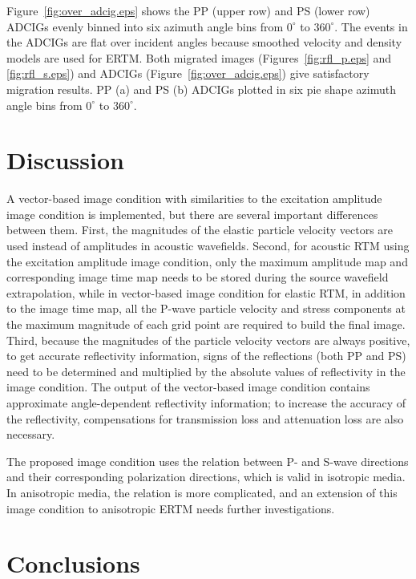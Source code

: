 \documentclass[manuscript,ulem,graphix,revised]{geophysics}
\begin{document}
Figure~\ref{fig:over_adcig.eps} shows the PP (upper row) and PS (lower row) ADCIGs evenly binned into six azimuth angle bins from $\mathrm{0^\circ}$ to $\mathrm{360^\circ}$. The events in the ADCIGs are flat over incident angles because smoothed velocity and density models are used for ERTM. Both migrated images (Figures~\ref{fig:rfl_p.eps} and \ref{fig:rfl_s.eps}) and ADCIGs (Figure~\ref{fig:over_adcig.eps}) give satisfactory migration results.
{
PP (a) and PS (b) ADCIGs plotted in six pie shape azimuth angle bins from $\mathrm{0^\circ}$ to $\mathrm{360^\circ}$.
}

\section{Discussion}

A vector-based image condition with similarities to the excitation amplitude image condition \citep{nguyen13} is implemented, but there are several important differences between them. First, the magnitudes of the elastic particle velocity vectors are used instead of amplitudes in acoustic wavefields. Second, for acoustic RTM using the excitation amplitude image condition, only the maximum amplitude map and corresponding image time map needs to be stored during the source wavefield extrapolation, while in vector-based image condition for elastic RTM, in addition to the image time map, all the P-wave particle velocity and stress components at the maximum magnitude of each grid point are required to build the final image. Third, because the magnitudes of the particle velocity vectors are always positive, to get accurate reflectivity information, signs of the reflections (both PP and PS) need to be determined and multiplied by the absolute values of reflectivity in the image condition. The output of the vector-based image condition contains approximate angle-dependent reflectivity information; to increase the accuracy of the reflectivity, compensations for transmission loss and attenuation loss \citep{deng07,deng08} are also necessary.

The proposed image condition uses the relation between P- and S-wave directions and their corresponding polarization directions, which is valid in isotropic media. In anisotropic media, the relation is more complicated, and an extension of this image condition to anisotropic ERTM needs further investigations.


\section{Conclusions}
\end{document}
